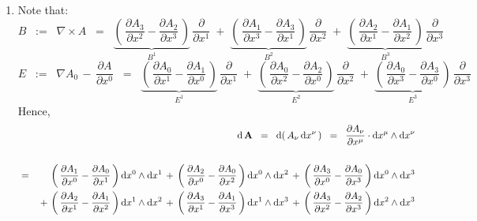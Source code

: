 \proof
\begin{enumerate}
\item
	Note that:
	\begin{equation*}
	B
	\;\; := \;\;
		\nabla \times A
	\;\; = \;\;
		\underset{B^{1}}{\underbrace{\left(\,\dfrac{\partial A_{3}}{\partial x^{2}} - \dfrac{\partial A_{2}}{\partial x^{3}}\,\right)}}
		\,\dfrac{\partial}{\partial x^{1}}
		\; + \;
		\underset{B^{2}}{\underbrace{\left(\,\dfrac{\partial A_{1}}{\partial x^{3}} - \dfrac{\partial A_{3}}{\partial x^{1}}\,\right)}}
		\,\dfrac{\partial}{\partial x^{2}}
		\; + \;
		\underset{B^{3}}{\underbrace{\left(\,\dfrac{\partial A_{2}}{\partial x^{1}} - \dfrac{\partial A_{1}}{\partial x^{2}}\,\right)}}
		\,\dfrac{\partial}{\partial x^{3}}
	\end{equation*}
	\begin{equation*}
	E
	\;\; := \;\;
		\nabla A_{0} \,-\, \dfrac{\partial A}{\partial x^{0}}
	\;\; = \;\;
		\underset{E^{1}}{\underbrace{\left(\,\dfrac{\partial A_{0}}{\partial x^{1}} - \dfrac{\partial A_{1}}{\partial x^{0}}\,\right)}}
		\,\dfrac{\partial}{\partial x^{1}}
		\; + \;
		\underset{E^{2}}{\underbrace{\left(\,\dfrac{\partial A_{0}}{\partial x^{2}} - \dfrac{\partial A_{2}}{\partial x^{0}}\,\right)}}
		\,\dfrac{\partial}{\partial x^{2}}
		\; + \;
		\underset{E^{3}}{\underbrace{\left(\,\dfrac{\partial A_{0}}{\partial x^{3}} - \dfrac{\partial A_{3}}{\partial x^{0}}\,\right)}}
		\,\dfrac{\partial}{\partial x^{3}}
	\end{equation*}
	Hence,
	\begin{eqnarray*}
	&&
		\d\,\mathbf{A}
	\;\; = \;\;
		\d\!\left(\,A_{\nu}\,\d x^{\nu}\,\right)
	\;\; = \;\;
		\dfrac{\partial A_{\nu}}{\partial x^{\mu}} \cdot \d x^{\mu} \wedge \d x^{\nu}
	\\ \\
	& = &
		\,{\color{white}+}\,
		\left(\,\dfrac{\partial A_{1}}{\partial x^{0}} - \dfrac{\partial A_{0}}{\partial x^{1}}\,\right)\d x^{0} \wedge \d x^{1}
		\,+\,
		\left(\,\dfrac{\partial A_{2}}{\partial x^{0}} - \dfrac{\partial A_{0}}{\partial x^{2}}\,\right)\d x^{0} \wedge \d x^{2}
		\,+\,
		\left(\,\dfrac{\partial A_{3}}{\partial x^{0}} - \dfrac{\partial A_{0}}{\partial x^{3}}\,\right)\d x^{0} \wedge \d x^{3}
	\\
	&&
		\,+\,
		\left(\,\dfrac{\partial A_{2}}{\partial x^{1}} - \dfrac{\partial A_{1}}{\partial x^{2}}\,\right)\d x^{1} \wedge \d x^{2}
		\,+\,
		\left(\,\dfrac{\partial A_{3}}{\partial x^{1}} - \dfrac{\partial A_{1}}{\partial x^{3}}\,\right)\d x^{1} \wedge \d x^{3}
		\,+\,
		\left(\,\dfrac{\partial A_{3}}{\partial x^{2}} - \dfrac{\partial A_{2}}{\partial x^{3}}\,\right)\d x^{2} \wedge \d x^{3}

\end{eqnarray*}
\end{enumerate}
